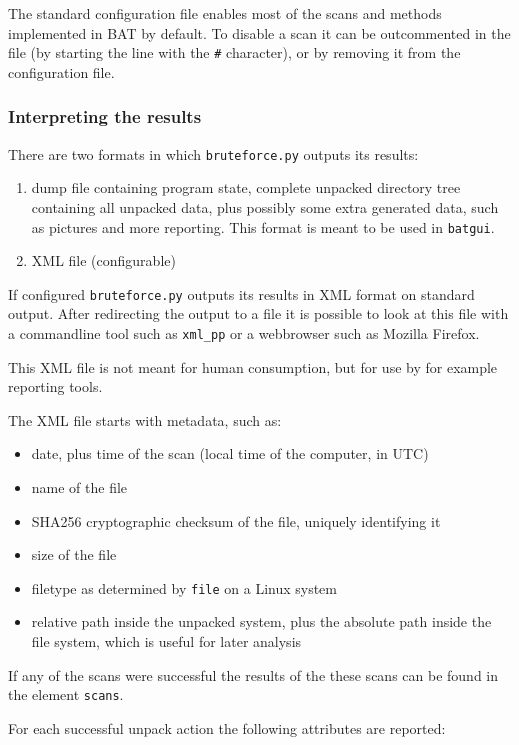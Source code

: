 \documentclass[10pt]{article}
\begin{document}
The standard configuration file enables most of the scans and methods
implemented in BAT by default. To disable a scan it can be outcommented in the
file (by starting the line with the \texttt{\#} character), or by removing it
from the configuration file.

\subsubsection{Interpreting the results}

There are two formats in which \texttt{bruteforce.py} outputs its results:

\begin{enumerate}
\item dump file containing program state, complete unpacked directory tree
containing all unpacked data, plus possibly some extra generated data, such
as pictures and more reporting. This format is meant to be used in
\texttt{batgui}.
\item XML file (configurable)
\end{enumerate}

If configured \texttt{bruteforce.py} outputs its results in XML format on
standard output. After redirecting the output to a file it is possible to look
at this file with a commandline tool such as \texttt{xml\_pp} or a webbrowser
such as Mozilla Firefox.

This XML file is not meant for human consumption, but for use by for example
reporting tools.

The XML file starts with metadata, such as:

\begin{itemize}
\item date, plus time of the scan (local time of the computer, in UTC)
\item name of the file
\item SHA256 cryptographic checksum of the file, uniquely identifying it
\item size of the file
\item filetype as determined by \texttt{file} on a Linux system
\item relative path inside the unpacked system, plus the absolute path inside
the file system, which is useful for later analysis
\end{itemize}

If any of the scans were successful the results of the these scans can
be found in the element \texttt{scans}.

For each successful unpack action the following attributes are reported:
\end{document}
